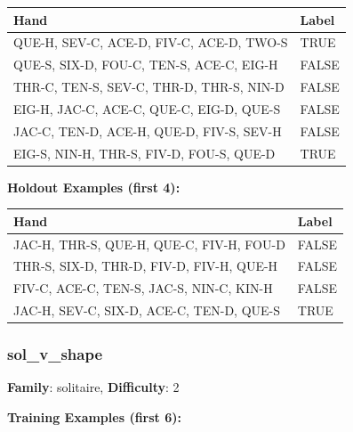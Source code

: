 \documentclass[10pt,a4paper]{article}
\begin{document}
\begin{small}
\begin{tabular}{p{8cm}l}
\toprule
Hand & Label \\
\midrule
QUE-H, SEV-C, ACE-D, FIV-C, ACE-D, TWO-S & \textcolor{positive}{TRUE} \\
QUE-S, SIX-D, FOU-C, TEN-S, ACE-C, EIG-H & \textcolor{negative}{FALSE} \\
THR-C, TEN-S, SEV-C, THR-D, THR-S, NIN-D & \textcolor{negative}{FALSE} \\
EIG-H, JAC-C, ACE-C, QUE-C, EIG-D, QUE-S & \textcolor{negative}{FALSE} \\
JAC-C, TEN-D, ACE-H, QUE-D, FIV-S, SEV-H & \textcolor{negative}{FALSE} \\
EIG-S, NIN-H, THR-S, FIV-D, FOU-S, QUE-D & \textcolor{positive}{TRUE} \\
\bottomrule
\end{tabular}
\end{small}

\textbf{Holdout Examples (first 4):}

\begin{small}
\begin{tabular}{p{8cm}l}
\toprule
Hand & Label \\
\midrule
JAC-H, THR-S, QUE-H, QUE-C, FIV-H, FOU-D & \textcolor{negative}{FALSE} \\
THR-S, SIX-D, THR-D, FIV-D, FIV-H, QUE-H & \textcolor{negative}{FALSE} \\
FIV-C, ACE-C, TEN-S, JAC-S, NIN-C, KIN-H & \textcolor{negative}{FALSE} \\
JAC-H, SEV-C, SIX-D, ACE-C, TEN-D, QUE-S & \textcolor{positive}{TRUE} \\
\bottomrule
\end{tabular}
\end{small}

\vspace{0.5cm}

\subsubsection{sol\_v\_shape}

\textbf{Family}: solitaire, \textbf{Difficulty}: 2

\textbf{Training Examples (first 6):}
\end{document}
